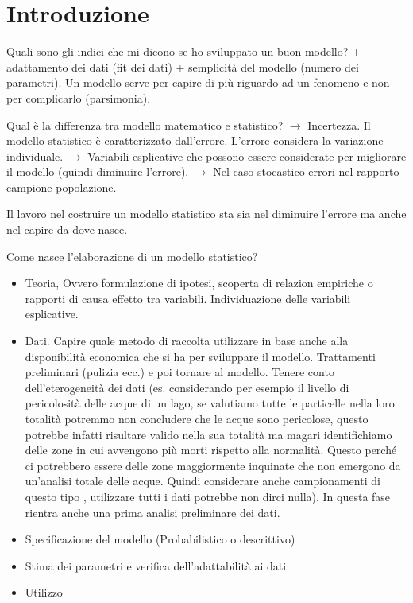 \chapter{Introduzione}
Quali sono gli indici che mi dicono se ho sviluppato un buon modello? +
adattamento dei dati (fit dei dati) + semplicità del modello (numero dei
parametri). Un modello serve per capire di più riguardo ad un fenomeno e
non per complicarlo (parsimonia).

Qual è la differenza tra modello matematico e statistico?
\(\rightarrow\) Incertezza. Il modello statistico è caratterizzato
dall'errore. L'errore considera la variazione individuale.
\(\rightarrow\) Variabili esplicative che possono essere considerate per
migliorare il modello (quindi diminuire l'errore). \(\rightarrow\) Nel
caso stocastico errori nel rapporto campione-popolazione.

Il lavoro nel costruire un modello statistico sta sia nel diminuire
l'errore ma anche nel capire da dove nasce. 

Come nasce l'elaborazione di un modello statistico?

\begin{itemize}
	\tightlist
	\item
	Teoria, Ovvero formulazione di ipotesi, scoperta di relazion empiriche
	o rapporti di causa effetto tra variabili. Individuazione delle
	variabili esplicative.
	\item
	Dati. Capire quale metodo di raccolta utilizzare in base anche alla
	disponibilità economica che si ha per sviluppare il modello.
	Trattamenti preliminari (pulizia ecc.) e poi tornare al modello.
	Tenere conto dell'eterogeneità dei dati (es. considerando per esempio
	il livello di pericolosità delle acque di un lago, se valutiamo tutte
	le particelle nella loro totalità potremmo non concludere che le acque
	sono pericolose, questo potrebbe infatti risultare valido nella sua
	totalità ma magari identifichiamo delle zone in cui avvengono più
	morti rispetto alla normalità. Questo perché ci potrebbero essere
	delle zone maggiormente inquinate che non emergono da un'analisi
	totale delle acque. Quindi considerare anche campionamenti di questo
	tipo , utilizzare tutti i dati potrebbe non dirci nulla). In questa
	fase rientra anche una prima analisi preliminare dei dati.
	\item
	Specificazione del modello (Probabilistico o descrittivo)
	\item
	Stima dei parametri e verifica dell'adattabilità ai dati
	\item
	Utilizzo
\end{itemize}

